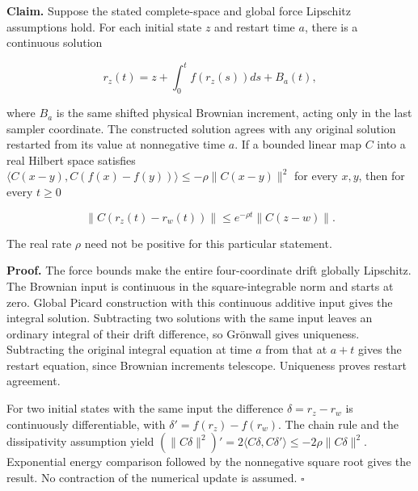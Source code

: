 \documentclass[11pt,a4paper]{report}
\begin{document}
\textbf{Claim.} Suppose the stated complete-space and global force Lipschitz assumptions hold. For each initial state \(z\) and restart time \(a\), there is a continuous solution

\[r_z(t)=z+\int_0^tf(r_z(s))ds+B_a(t),\]

where \(B_a\) is the same shifted physical Brownian increment, acting only in the last sampler coordinate. The constructed solution agrees with any original solution restarted from its value at nonnegative time \(a\). If a bounded linear map \(C\) into a real Hilbert space satisfies \(\langle C(x-y),C(f(x)-f(y))\rangle\le-\rho\|C(x-y)\|^2\) for every \(x,y\), then for every \(t\ge0\)

\[\|C(r_z(t)-r_w(t))\|\le e^{-\rho t}\|C(z-w)\|.\]

The real rate \(\rho\) need not be positive for this particular statement.



\textbf{Proof.} The force bounds make the entire four-coordinate drift globally Lipschitz. The Brownian input is continuous in the square-integrable norm and starts at zero. Global Picard construction with this continuous additive input gives the integral solution. Subtracting two solutions with the same input leaves an ordinary integral of their drift difference, so Grönwall gives uniqueness. Subtracting the original integral equation at time \(a\) from that at \(a+t\) gives the restart equation, since Brownian increments telescope. Uniqueness proves restart agreement.



For two initial states with the same input the difference \(\delta=r_z-r_w\) is continuously differentiable, with \(\delta'=f(r_z)-f(r_w)\). The chain rule and the dissipativity assumption yield \((\|C\delta\|^2)'=2\langle C\delta,C\delta'\rangle\le-2\rho\|C\delta\|^2\). Exponential energy comparison followed by the nonnegative square root gives the result. No contraction of the numerical update is assumed. \(\square\)
\end{document}
